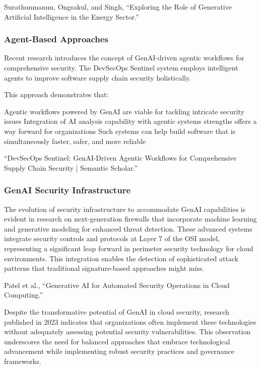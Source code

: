 Surathunmanun, Ongsakul, and Singh, “Exploring the Role of Generative Artificial Intelligence in the Energy Sector.”


\subsubsection{Agent-Based Approaches} %
\label{sec:Agent-Based Approaches}

Recent research introduces the concept of GenAI-driven agentic workflows for comprehensive security. The DevSecOps Sentinel system employs intelligent agents to improve software supply chain security holistically.

This approach demonstrates that:

Agentic workflows powered by GenAI are viable for tackling intricate security issues
Integration of AI analysis capability with agentic systems strengths offers a way forward for organizations
Such systems can help build software that is simultaneously faster, safer, and more reliable

“DevSecOps Sentinel: GenAI-Driven Agentic Workflows for Comprehensive Supply Chain Security | Semantic Scholar.”


\subsubsection{GenAI Security Infrastructure} %
\label{sec:GenAI Security Infrastructure}

The evolution of security infrastructure to accommodate GenAI capabilities is evident in research on next-generation firewalls that incorporate machine learning and generative modeling for enhanced threat detection. These advanced systems integrate security controls and protocols at Layer 7 of the OSI model, representing a significant leap forward in perimeter security technology for cloud environments. This integration enables the detection of sophisticated attack patterns that traditional signature-based approaches might miss.

Patel et al., “Generative AI for Automated Security Operations in Cloud Computing.”

Despite the transformative potential of GenAI in cloud security, research published in 2023 indicates that organizations often implement these technologies without adequately assessing potential security vulnerabilities. This observation underscores the need for balanced approaches that embrace technological advancement while implementing robust security practices and governance frameworks.

